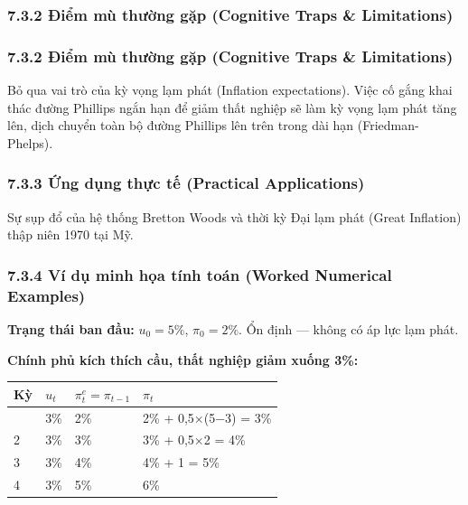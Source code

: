 \documentclass[
]{article}
\newcounter{none} %
\begin{document}
\subsubsection{7.3.2 Điểm mù thường gặp (Cognitive Traps \&
Limitations)}\label{ux111iux1ec3m-muxf9-thux1b0ux1eddng-gux1eb7p-cognitive-traps-limitations-35}

\subsubsection{7.3.2 Điểm mù thường gặp (Cognitive Traps \&
Limitations)}\label{ux111iux1ec3m-muxf9-thux1b0ux1eddng-gux1eb7p-cognitive-traps-limitations-36}

Bỏ qua vai trò của kỳ vọng lạm phát (Inflation expectations). Việc cố
gắng khai thác đường Phillips ngắn hạn để giảm thất nghiệp sẽ làm kỳ
vọng lạm phát tăng lên, dịch chuyển toàn bộ đường Phillips lên trên
trong dài hạn (Friedman-Phelps).

\subsubsection{7.3.3 Ứng dụng thực tế (Practical
Applications)}\label{ux1ee9ng-dux1ee5ng-thux1ef1c-tux1ebf-practical-applications-19}

Sự sụp đổ của hệ thống Bretton Woods và thời kỳ Đại lạm phát (Great
Inflation) thập niên 1970 tại Mỹ.

\subsubsection{7.3.4 Ví dụ minh họa tính toán (Worked Numerical
Examples)}\label{vuxed-dux1ee5-minh-hux1ecda-tuxednh-touxe1n-worked-numerical-examples-18}

\textbf{Trạng thái ban đầu:} \(u_0 = 5\%\), \(\pi_0 = 2\%\). Ổn định ---
không có áp lực lạm phát.

\textbf{Chính phủ kích thích cầu, thất nghiệp giảm xuống 3\%:}

{\def\LTcaptype{none} %
\begin{longtable}[]{@{}llll@{}}
\toprule\noalign{}
Kỳ & \(u_t\) & \(\pi_t^e = \pi_{t-1}\) & \(\pi_t\) \\
\midrule\noalign{}
\endhead
\bottomrule\noalign{}
\endlastfoot
1 & 3\% & 2\% & 2\% + 0,5×(5−3) = 3\% \\
2 & 3\% & 3\% & 3\% + 0,5×2 = 4\% \\
3 & 3\% & 4\% & 4\% + 1 = 5\% \\
4 & 3\% & 5\% & 6\% \\
\end{longtable}
}
\end{document}
